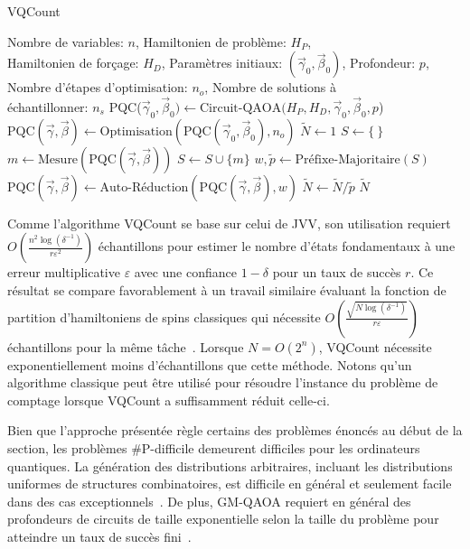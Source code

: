 \begin{algorithm}[ht!]
    \caption{VQCount}\label{alg:vqcount}
    \begin{algorithmic}[1]
    \REQUIRE Nombre de variables: $n$, Hamiltonien de problème: $H_P$,\\Hamiltonien de forçage: $H_D$, Paramètres initiaux: $(\vec{\gamma}_0, \vec{\beta}_0)$, Profondeur: $p$, Nombre d'étapes d'optimisation: $n_{o}$, Nombre de solutions à\\échantillonner: $n_s$
    \STATE PQC($\vec{\gamma}_0, \vec{\beta}_0) \leftarrow \text{Circuit-QAOA}(H_P, H_D, \vec{\gamma}_0, \vec{\beta}_0, p$) \\
    \STATE $\text{PQC}(\vec{\gamma}, \vec{\beta}) \leftarrow \text{Optimisation}(\text{PQC}(\vec{\gamma}_0, \vec{\beta}_0), n_{o})$
    \STATE $\tilde{N} \leftarrow 1$
    \STATE $S \leftarrow \{ \ \}$
    \STATE $m \leftarrow \text{Mesure}(\text{PQC}(\vec{\gamma}, \vec{\beta}))$
    \STATE $S \leftarrow S \cup \{m\}$
    \ENDIF
    \ENDWHILE
    \STATE $w, \tilde{p} \leftarrow \text{Préfixe-Majoritaire}(S)$
    \STATE $\text{PQC}(\vec{\gamma}, \vec{\beta}) \leftarrow \text{Auto-Réduction}(\text{PQC}(\vec{\gamma}, \vec{\beta}), w)$
    \STATE $\tilde{N} \leftarrow \tilde{N} / \tilde{p}$
    \ENDFOR
    \RETURN $\tilde{N}$
\end{algorithmic}
\end{algorithm}
    
Comme l'algorithme VQCount se base sur celui de JVV, son utilisation requiert $O(\frac{n^{2} \log (\delta^{-1})}{r \varepsilon^{2}})$ échantillons pour estimer le nombre d'états fondamentaux à une erreur multiplicative $\varepsilon$ avec une confiance $1 - \delta$ pour un taux de succès $r$. Ce résultat se compare favorablement à un travail similaire évaluant la fonction de partition d'hamiltoniens de spins classiques qui nécessite $O(\frac{\sqrt{N \log(\delta^{-1})}}{r \varepsilon})$ échantillons pour la même tâche~\cite{sundarQuantumAlgorithmCount2019}. Lorsque $N=O(2^{n})$, VQCount nécessite exponentiellement moins d'échantillons que cette méthode. Notons qu'un algorithme classique peut être utilisé pour résoudre l'instance du problème de comptage lorsque VQCount a suffisamment réduit celle-ci.

Bien que l'approche présentée règle certains des problèmes énoncés au début de la section, les problèmes \textsf{\#P}-difficile demeurent difficiles pour les ordinateurs quantiques. La génération des distributions arbitraires, incluant les distributions uniformes de structures combinatoires, est difficile en général et seulement facile dans des cas exceptionnels~\cite{aaronsonComputationalComplexityLinear2011, boulandComplexityVerificationQuantum2019}. De plus, GM-QAOA requiert en général des profondeurs de circuits de taille exponentielle selon la taille du problème pour atteindre un taux de succès fini~\cite{xiePerformanceUpperBound2025}. 

